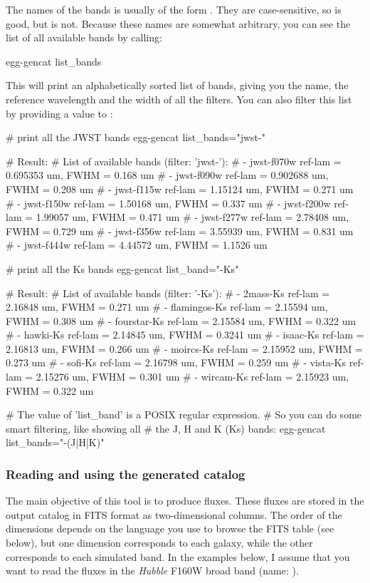 \documentclass[12pt,a4paper]{article}
\newcommand{\hubble}{{\it Hubble}\xspace}
\begin{document}
The names of the bands is usually of the form \bashinline{[instrument]-[band]}. They are case-sensitive, so  is good, but  is not. Because these names are somewhat arbitrary, you can see the list of all available bands by calling:
\begin{bashcode}
egg-gencat list_bands
\end{bashcode}
This will print an alphabetically sorted list of bands, giving you the name, the reference wavelength and the width of all the filters. You can also filter this list by providing a value to :
\begin{bashcode}
# print all the JWST bands
egg-gencat list_bands="jwst-"

# Result:
# List of available bands (filter: 'jwst-'):
#  - jwst-f070w  ref-lam = 0.695353 um, FWHM = 0.168 um
#  - jwst-f090w  ref-lam = 0.902688 um, FWHM = 0.208 um
#  - jwst-f115w  ref-lam = 1.15124 um,  FWHM = 0.271 um
#  - jwst-f150w  ref-lam = 1.50168 um,  FWHM = 0.337 um
#  - jwst-f200w  ref-lam = 1.99057 um,  FWHM = 0.471 um
#  - jwst-f277w  ref-lam = 2.78408 um,  FWHM = 0.729 um
#  - jwst-f356w  ref-lam = 3.55939 um,  FWHM = 0.831 um
#  - jwst-f444w  ref-lam = 4.44572 um,  FWHM = 1.1526 um


# print all the Ks bands
egg-gencat list_band="-Ks"

# Result:
# List of available bands (filter: '-Ks'):
#  - 2mass-Ks      ref-lam = 2.16848 um, FWHM = 0.271 um
#  - flamingos-Ks  ref-lam = 2.15594 um, FWHM = 0.308 um
#  - fourstar-Ks   ref-lam = 2.15584 um, FWHM = 0.322 um
#  - hawki-Ks      ref-lam = 2.14845 um, FWHM = 0.3241 um
#  - isaac-Ks      ref-lam = 2.16813 um, FWHM = 0.266 um
#  - moircs-Ks     ref-lam = 2.15952 um, FWHM = 0.273 um
#  - sofi-Ks       ref-lam = 2.16798 um, FWHM = 0.259 um
#  - vista-Ks      ref-lam = 2.15276 um, FWHM = 0.301 um
#  - wircam-Ks     ref-lam = 2.15923 um, FWHM = 0.322 um

# The value of 'list_band' is a POSIX regular expression.
# So you can do some smart filtering, like showing all
# the J, H and K (Ks) bands:
egg-gencat list_bands="-(J|H|K)"
\end{bashcode}

\subsubsection{Reading and using the generated catalog}

The main objective of this tool is to produce fluxes. These fluxes are stored in the output catalog in FITS format as two-dimensional columns. The order of the dimensions depends on the language you use to browse the FITS table (see below), but one dimension corresponds to each galaxy, while the other corresponds to each simulated band. In the examples below, I assume that you want to read the fluxes in the \hubble F160W broad band (name: ).
\end{document}
